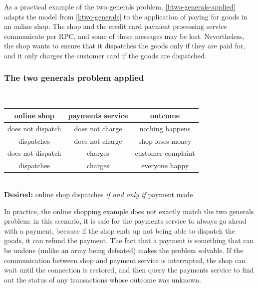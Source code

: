 As a practical example of the two generals problem, \autoref{l:two-generals-applied} adapts the model from \autoref{l:two-generals} to the application of paying for goods in an online shop.
The shop and the credit card payment processing service communicate per RPC, and some of these messages may be lost.
Nevertheless, the shop wants to ensure that it dispatches the goods only if they are paid for, and it only charges the customer card if the goods are dispatched.

\begin{frame}
    \label{s:two-generals-applied}
    \frametitle{The two generals problem applied}
    \begin{center}
        \\[0.5em]\pause
        \renewcommand{\arraystretch}{1.3}
        \begin{tabular}{c|c|c}
            \hline
            online shop & payments service & outcome \\\hline
            does not dispatch & does not charge & nothing happens \\
            dispatches & does not charge & shop loses money \\
            does not dispatch & charges & customer complaint \\
            dispatches & charges & everyone happy \\\hline
        \end{tabular}\\[1em]
        \textbf{Desired:} online shop dispatches \emph{if and only if} payment made
    \end{center}
\end{frame}
\label{l:two-generals-applied}

In practice, the online shopping example does not exactly match the two generals problem: in this scenario, it is safe for the payments service to always go ahead with a payment, because if the shop ends up not being able to dispatch the goods, it can refund the payment.
The fact that a payment is something that can be undone (unlike an army being defeated) makes the problem solvable.
If the communication between shop and payment service is interrupted, the shop can wait until the connection is restored, and then query the payments service to find out the status of any transactions whose outcome was unknown.

